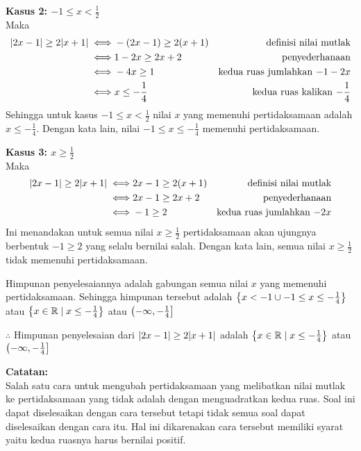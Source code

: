 \begin{enumerate}[leftmargin=*, label={\arabic*}.]
\textbf{Kasus 2: $-1 \leq x < \frac{1}{2}$}\\
Maka
\begin{align*}
    \abs{2x-1} \geq 2\abs{x+1} \iff &-(2x-1) \geq 2(x+1)
    &\text{definisi nilai mutlak} \\
    \iff &1-2x \geq 2x+2
    &\text{penyederhanaan}\\
    \iff &-4x \geq 1
    &\text{kedua ruas jumlahkan $-1-2x$}\\
    \iff &x \leq -\frac{1}{4}
    &\text{kedua ruas kalikan $-\frac{1}{4}$}
\end{align*}
Sehingga untuk kasus $-1 \leq x < \frac{1}{2}$ nilai $x$ yang memenuhi 
pertidaksamaan adalah $x \leq -\frac{1}{4}$. Dengan kata lain, nilai 
$-1 \leq x \leq -\frac{1}{4}$ memenuhi pertidaksamaan.

\textbf{Kasus 3: $x \geq \frac{1}{2}$}\\
Maka
\begin{align*}
    \abs{2x-1} \geq 2\abs{x+1} 
    \iff &2x-1 \geq 2(x+1)
    &\text{definisi nilai mutlak} \\
    \iff &2x-1 \geq 2x+2
    &\text{penyederhanaan}\\
    \iff &-1 \geq 2
    &\text{kedua ruas jumlahkan $-2x$}
\end{align*}
Ini menandakan untuk semua nilai $x \geq \frac{1}{2}$ pertidaksamaan 
akan ujungnya berbentuk $-1 \geq 2$ yang selalu bernilai salah.
Dengan kata lain, semua nilai $x \geq \frac{1}{2}$ tidak memenuhi 
pertidaksamaan.

Himpunan penyelesaiannya adalah gabungan semua nilai $x$ yang memenuhi 
pertidaksamaan. Sehingga himpunan tersebut adalah 
$\set*{x < -1 \cup -1 \leq x \leq -\frac{1}{4}}$ 
atau $\set*{x \in \mathbb{R} \mid x \leq -\frac{1}{4}}$
atau $\oic*{-\infty,-\frac{1}{4}}$

$\therefore$ Himpunan penyelesaian dari $\abs{2x-1} \geq 2\abs{x+1}$
adalah $\set*{x \in \mathbb{R} \mid x \leq -\frac{1}{4}}$
atau $\oic*{-\infty,-\frac{1}{4}}$

\vspace{0.1cm}
\textbf{Catatan:}\\
Salah satu cara untuk mengubah pertidaksamaan yang melibatkan nilai mutlak ke 
pertidaksamaan yang tidak adalah dengan menguadratkan kedua ruas. Soal ini 
dapat diselesaikan dengan cara tersebut tetapi tidak semua soal dapat 
diselesaikan dengan cara itu. Hal ini dikarenakan cara tersebut memiliki syarat 
yaitu kedua ruasnya harus bernilai positif.



\end{enumerate}
